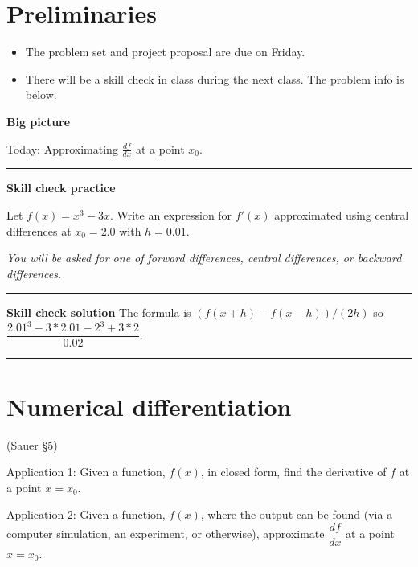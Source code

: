 \documentclass[12pt,letterpaper,noanswers]{exam}
\begin{document}
 \pdfpageheight 11in 
  \pdfpagewidth 8.5in

\noindent 

\section*{Preliminaries}

\begin{itemize}
\itemsep0pt
\item The problem set and project proposal are due on Friday.
\item There will be a skill check in class during the next class.  The problem info is below.
\end{itemize}


\noindent\textbf{Big picture}

Today: Approximating $\frac{df}{dx}$ at a point $x_0$.

\vspace{0.2cm}
\hrule
\vspace{0.2cm}

\noindent \textbf{Skill check practice}

Let $f(x) = x^3 - 3x$.  Write an expression for $f'(x)$ approximated using central differences at $x_0 = 2.0$ with $h = 0.01$.

\emph{You will be asked for one of forward differences, central differences, or backward differences.}


\vspace{0.2cm}
\hrule
\vspace{0.2cm}

\noindent \textbf{Skill check solution}
 The formula is $(f(x+h) - f(x-h))/(2h)$ so $\dfrac{2.01^3-3*2.01 - 2^3+3*2}{0.02}$.


\vspace{0.2cm}
\hrule
\vspace{0.2cm}



\section*{Numerical differentiation}

(Sauer \S 5)

\noindent Application 1: Given a function, $f(x)$, in closed form, find the derivative of $f$ at a point $x = x_0$. 

\noindent Application 2: Given a function, $f(x)$, where the output can be found (via a computer simulation, an experiment, or otherwise), approximate $\dfrac{df}{dx}$ at a point $x = x_0$.
\end{document}
